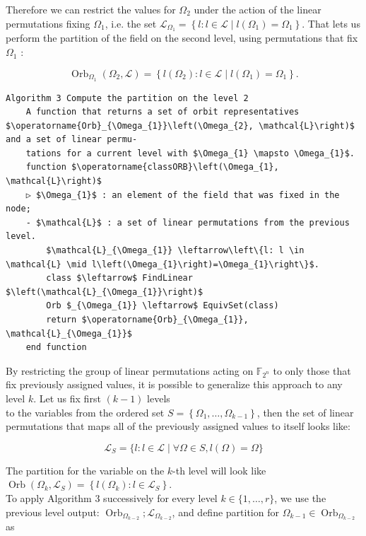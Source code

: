 \documentclass[10pt]{article}
\begin{document}
Therefore we can restrict the values for $\Omega_{2}$ under the action of the linear permutations fixing $\Omega_{1}$, i.e. the set $\mathcal{L}_{\Omega_{1}}=\left\{l: l \in \mathcal{L} \mid l\left(\Omega_{1}\right)=\Omega_{1}\right\}$. That lets us perform the partition of the field on the second level, using permutations that fix $\Omega_{1}$ :

$$
\operatorname{Orb}_{\Omega_{1}}\left(\Omega_{2}, \mathcal{L}\right)=\left\{l\left(\Omega_{2}\right): l \in \mathcal{L} \mid l\left(\Omega_{1}\right)=\Omega_{1}\right\} .
$$

\begin{verbatim}
Algorithm 3 Compute the partition on the level 2
    A function that returns a set of orbit representatives $\operatorname{Orb}_{\Omega_{1}}\left(\Omega_{2}, \mathcal{L}\right)$ and a set of linear permu-
    tations for a current level with $\Omega_{1} \mapsto \Omega_{1}$.
    function $\operatorname{classORB}\left(\Omega_{1}, \mathcal{L}\right)$
    ▷ $\Omega_{1}$ : an element of the field that was fixed in the node;
    - $\mathcal{L}$ : a set of linear permutations from the previous level.
        $\mathcal{L}_{\Omega_{1}} \leftarrow\left\{l: l \in \mathcal{L} \mid l\left(\Omega_{1}\right)=\Omega_{1}\right\}$.
        class $\leftarrow$ FindLinear $\left(\mathcal{L}_{\Omega_{1}}\right)$
        Orb $_{\Omega_{1}} \leftarrow$ EquivSet(class)
        return $\operatorname{Orb}_{\Omega_{1}}, \mathcal{L}_{\Omega_{1}}$
    end function
\end{verbatim}

By restricting the group of linear permutations acting on $\mathbb{F}_{2^{n}}$ to only those that fix previously assigned values, it is possible to generalize this approach to any level $k$. Let us fix first $(k-1)$ levels\\
to the variables from the ordered set $S=\left\{\Omega_{1}, \ldots, \Omega_{k-1}\right\}$, then the set of linear permutations that maps all of the previously assigned values to itself looks like:


\begin{equation*}
\mathcal{L}_{S}=\{l: l \in \mathcal{L} \mid \forall \Omega \in S, l(\Omega)=\Omega\} \tag{9}
\end{equation*}


The partition for the variable on the $k$-th level will look like $\operatorname{Orb}\left(\Omega_{k}, \mathcal{L}_{S}\right)=\left\{l\left(\Omega_{k}\right): l \in \mathcal{L}_{S}\right\}$.\\
To apply Algorithm 3 successively for every level $k \in\{1, \ldots, r\}$, we use the previous level output: $\operatorname{Orb}_{\Omega_{k-2}} ; \mathcal{L}_{\Omega_{k-2}}$, and define partition for $\Omega_{k-1} \in \operatorname{Orb}_{\Omega_{k-2}}$ as
\end{document}
